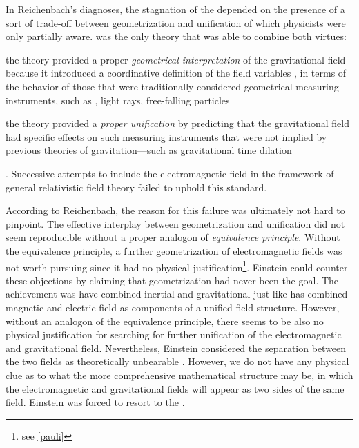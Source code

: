 \documentclass[draft]{article}
\begin{document}
In Reichenbach's diagnoses, the stagnation of the \uftp depended on the presence of a sort of trade-off between geometrization and unification of which physicists were only partially aware. \Gr was the only theory that was able to combine both virtues: \begin{inparaenum}[(1)] \item the theory provided a proper \emph{geometrical interpretation} of the gravitational field because it introduced a coordinative definition of the field variables \gmn, in terms of the behavior of those that were traditionally considered geometrical measuring instruments, such as \rac, light rays, free-falling particles \item the theory provided a \emph{proper unification} by predicting that the gravitational field had specific effects on such measuring instruments that were not implied by previous theories of gravitation---such as gravitational time dilation \end{inparaenum} \citep[350]{Reichenbach1928}. Successive attempts to include the electromagnetic field in the framework of general relativistic field theory failed to uphold this standard. 


According to Reichenbach, the reason for this failure was ultimately not hard to pinpoint. The effective interplay between geometrization and unification did not seem reproducible without a proper analogon of \emph{equivalence principle}. Without the equivalence principle, a further geometrization of electromagnetic fields was not worth pursuing since it had no physical justification\footnote{see \cref{pauli}}. Einstein could counter these objections by claiming that geometrization had never been the goal. The achievement \gr was have combined inertial and gravitational just like \sr has combined magnetic and electric field as components of a unified field structure. However, without an analogon of the equivalence principle, there seems to be also no physical justification for searching for further unification of the electromagnetic and gravitational field. Nevertheless, Einstein considered the separation between the two fields as theoretically unbearable \citep[24]{Einstein1930i}. However, we do not have any physical clue as to what the more comprehensive mathematical structure may be, in which the electromagnetic and gravitational fields will appear as two sides of the same field. Einstein was forced to resort to the .
\end{document}

